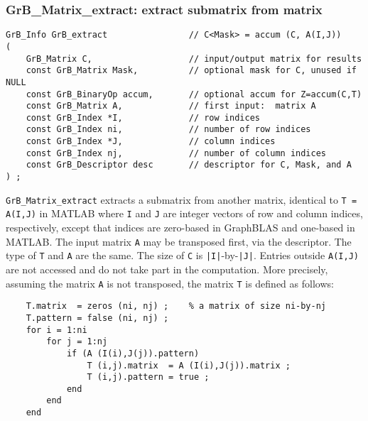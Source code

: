 \documentclass[12pt]{article}
\begin{document}
\newpage
\subsubsection{{\sf GrB\_Matrix\_extract:} extract submatrix from matrix}
\label{extract_matrix}

\begin{mdframed}[userdefinedwidth=6in]
{\footnotesize
\begin{verbatim}
GrB_Info GrB_extract                // C<Mask> = accum (C, A(I,J))
(
    GrB_Matrix C,                   // input/output matrix for results
    const GrB_Matrix Mask,          // optional mask for C, unused if NULL
    const GrB_BinaryOp accum,       // optional accum for Z=accum(C,T)
    const GrB_Matrix A,             // first input:  matrix A
    const GrB_Index *I,             // row indices
    const GrB_Index ni,             // number of row indices
    const GrB_Index *J,             // column indices
    const GrB_Index nj,             // number of column indices
    const GrB_Descriptor desc       // descriptor for C, Mask, and A
) ;
\end{verbatim} } \end{mdframed}

\verb'GrB_Matrix_extract' extracts a submatrix from another matrix, identical
to \verb'T = A(I,J)' in MATLAB where \verb'I' and \verb'J' are integer vectors
of row and column indices, respectively, except that indices are zero-based in
GraphBLAS and one-based in MATLAB.  The input matrix \verb'A' may be transposed
first, via the descriptor.  The type of \verb'T' and \verb'A' are the same.
The size of \verb'C' is \verb'|I|'-by-\verb'|J|'.
Entries outside \verb'A(I,J)' are not accessed and do not take part in the
computation.  More precisely, assuming the matrix \verb'A' is not transposed,
the matrix \verb'T' is defined as follows:

    \vspace{-0.1in}
    {\footnotesize
    \begin{verbatim}
    T.matrix  = zeros (ni, nj) ;    % a matrix of size ni-by-nj
    T.pattern = false (ni, nj) ;
    for i = 1:ni
        for j = 1:nj
            if (A (I(i),J(j)).pattern)
                T (i,j).matrix  = A (I(i),J(j)).matrix ;
                T (i,j).pattern = true ;
            end
        end
    end \end{verbatim}}
\end{document}
